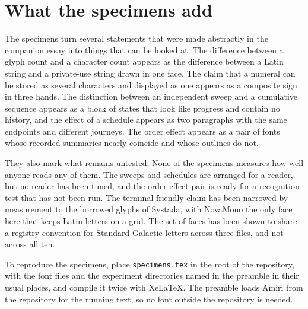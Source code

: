 \documentclass[11pt]{article}
\begin{document}
\section{What the specimens add}

The specimens turn several statements that were made abstractly in the companion essay into things that can be looked at. The difference between a glyph count and a character count appears as the difference between a Latin string and a private-use string drawn in one face. The claim that a numeral can be stored as several characters and displayed as one appears as a composite sign in three hands. The distinction between an independent sweep and a cumulative sequence appears as a block of states that look like progress and contain no history, and the effect of a schedule appears as two paragraphs with the same endpoints and different journeys. The order effect appears as a pair of fonts whose recorded summaries nearly coincide and whose outlines do not.

They also mark what remains untested. None of the specimens measures how well anyone reads any of them. The sweeps and schedules are arranged for a reader, but no reader has been timed, and the order-effect pair is ready for a recognition test that has not been run. The terminal-friendly claim has been narrowed by measurement to the borrowed glyphs of Systada, with NovaMono the only face here that keeps Latin letters on a grid. The set of faces has been shown to share a registry convention for Standard Galactic letters across three files, and not across all ten.

To reproduce the specimens, place \texttt{specimens.tex} in the root of the repository, with the font files and the experiment directories named in the preamble in their usual places, and compile it twice with XeLaTeX. The preamble loads Amiri from the repository for the running text, so no font outside the repository is needed.
\end{document}
